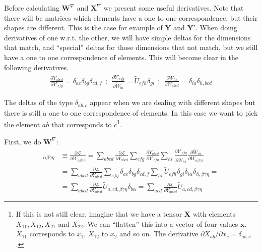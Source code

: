 \documentclass{article}
\begin{document}
\noindent Before calculating \(\mathbf{W}^\nabla\) and \(\mathbf{X}^\nabla\) we present some useful derivatives. Note that there will be matrices which elements have a one to one correspondence, but their shapes are different. This is the case for example of \(\mathbf{Y}\) and \(\mathbf{Y}'\). When doing derivatives of one w.r.t. the other, we will have simple deltas for the dimensions that match, and ``special'' deltas for those dimensions that not match, but we still have a one to one correspondence of elements. This will become clear in the following derivatives.
\begin{align*}
    \frac{\partial Y_{abcd}}{\partial Y'_{efg}} = \delta_{ae}\delta_{bg}\delta_{cd, f} ~~;~~ \frac{\partial Y'_{efg}}{\partial \tilde{W}_{hi}} = \tilde{U}_{efh}\delta_{gi} ~~;~~ \frac{\partial \tilde{W}_{hi}}{\partial W_{abcd}} = \delta_{ia}\delta_{h, bcd}
\end{align*}

\noindent The deltas of the type \(\delta_{ab,c}\) appear when we are dealing with different shapes but there is still a one to one correspondence of elements. In this case we want to pick the element \(ab\) that corresponds to \(c\)\footnote{If this is not still clear, imagine that we have a tensor \(\mathbf{X}\) with elements \(X_{11}, X_{12}, X_{21}\) and \(X_{22}\). We can ``flatten'' this into a vector of four values \(\mathbf{x}\). \(X_{11}\) corresponds to \(x_1\), \(X_{12}\) to \(x_2\) and so on. The derivative \(\partial X_{ab} / \partial x_c = \delta_{ab, c}\).}.

\noindent First, we do \(\mathbf{W}^\nabla\):
\begin{align*}
    [\mathbf{W}^\nabla]_{\alpha\beta\gamma\eta} &\equiv \frac{\partial \mathcal{L}}{\partial W_{\alpha\beta\gamma\eta}} = \sum_{abcd}\frac{\partial \mathcal{L}}{\partial Y_{abcd}}\sum_{efg}\frac{\partial Y_{abcd}}{\partial Y'_{efg}}\sum_{hi} \frac{\partial Y'_{efg}}{\partial \tilde{W}_{hi}}\frac{\partial \tilde{W}_{hi}}{\partial W_{\alpha\beta\gamma\eta}} \\
    &= \sum_{abcd}\frac{\partial \mathcal{L}}{\partial Y_{abcd}} \sum_{efg}\delta_{ae}\delta_{bg}\delta_{cd, f}\sum_{hi}\tilde{U}_{efh}\delta_{gi}\delta_{i\alpha}\delta_{h,\beta\gamma\eta} = \\
    &= \sum_{abcd}\frac{\partial \mathcal{L}}{\partial Y_{abcd}}\tilde{U}_{a,cd,\beta\gamma\eta}\delta_{b\alpha} = \sum_{acd} \frac{\partial \mathcal{L}}{\partial Y_{a\alpha cd}}\tilde{U}_{a,cd,\beta\gamma\eta}
\end{align*}
\end{document}
